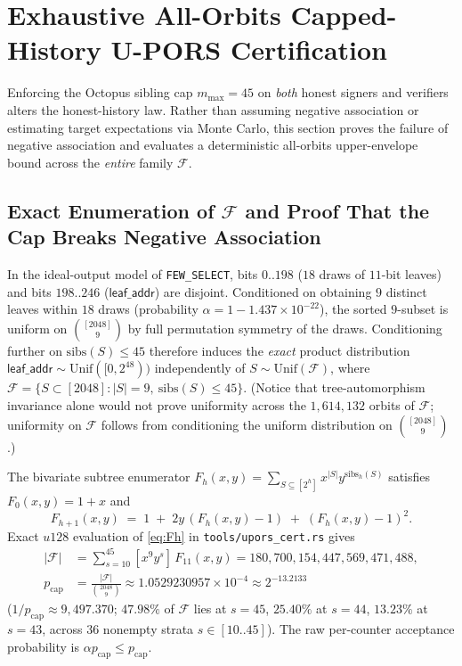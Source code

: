 \documentclass[11pt,a4paper]{article}
\theoremstyle{definition}
\theoremstyle{remark}
\newcommand{\UPORS}{\textsf{U-PORS}}
\newcommand{\Unif}{\mathrm{Unif}}
\newcommand{\calF}{\mathcal{F}}
\begin{document}
\section{Exhaustive All-Orbits Capped-History \UPORS{} Certification}
\label{sec:upors-security}

Enforcing the Octopus sibling cap $m_{\max} = 45$ on \emph{both} honest signers and verifiers alters the honest-history law. Rather than assuming negative association or estimating target expectations via Monte Carlo, this section proves the failure of negative association and evaluates a deterministic all-orbits upper-envelope bound across the \emph{entire} family $\calF$.

\subsection{Exact Enumeration of $\calF$ and Proof That the Cap Breaks Negative Association}
In the ideal-output model of \texttt{FEW\_SELECT}, bits $0..198$ ($18$ draws of $11$-bit leaves) and bits $198..246$ ($\mathsf{leaf\_addr}$) are disjoint. Conditioned on obtaining $9$ distinct leaves within $18$ draws (probability $\alpha = 1 - 1.437 \times 10^{-22}$), the sorted $9$-subset is uniform on $\binom{[2048]}{9}$ by full permutation symmetry of the draws. Conditioning further on $\mathrm{sibs}(S) \le 45$ therefore induces the \emph{exact} product distribution $\mathsf{leaf\_addr} \sim \Unif([0, 2^{48}))$ independently of $S \sim \Unif(\calF)$, where $\calF = \{S \subset [2048] : |S| = 9,\ \mathrm{sibs}(S) \le 45\}$. (Notice that tree-automorphism invariance alone would not prove uniformity across the $1{,}614{,}132$ orbits of $\calF$; uniformity on $\calF$ follows from conditioning the uniform distribution on $\binom{[2048]}{9}$.)

The bivariate subtree enumerator $F_h(x, y) = \sum_{S \subseteq [2^h]} x^{|S|} y^{\mathrm{sibs}_h(S)}$ satisfies $F_0(x, y) = 1 + x$ and
\begin{equation}
\label{eq:Fh}
  F_{h+1}(x, y) \;=\; 1 \;+\; 2y\,(F_h(x, y) - 1) \;+\; (F_h(x, y) - 1)^2.
\end{equation}
Exact $u128$ evaluation of \eqref{eq:Fh} in \texttt{tools/upors\_cert.rs} gives
\begin{align*}
  |\calF| &= \sum_{s=10}^{45} [x^9 y^s]\, F_{11}(x, y) = 180{,}700{,}154{,}447{,}569{,}471{,}488, \\
  p_{\mathrm{cap}} &= \frac{|\calF|}{\binom{2048}{9}} \approx 1.0529230957 \times 10^{-4} \approx 2^{-13.2133}
\end{align*}
($1 / p_{\mathrm{cap}} \approx 9{,}497.370$; $47.98\%$ of $\calF$ lies at $s = 45$, $25.40\%$ at $s = 44$, $13.23\%$ at $s = 43$, across $36$ nonempty strata $s \in [10..45]$). The raw per-counter acceptance probability is $\alpha p_{\mathrm{cap}} \le p_{\mathrm{cap}}$.
\end{document}
